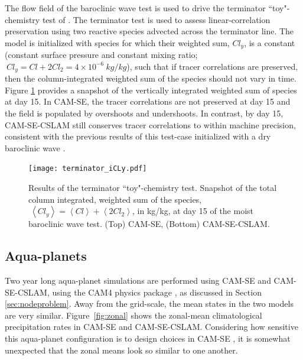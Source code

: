 \documentclass{ametsoc}
\begin{document}
The flow field of the baroclinic wave test is used to drive the terminator ``toy"-chemistry test of \cite{LCLVT2015GMD,LTOUNGK2017MWR}. The terminator test is used to assess linear-correlation preservation using two reactive species advected across the terminator line. The model is initialized with species for which their weighted sum, $Cl_y$, is a constant (constant surface pressure and constant mixing ratio;$\ Cl_y = Cl + 2Cl_2 = 4\times 10^{-6}\ kg/kg$), such that if tracer correlations are preserved, then the column-integrated weighted sum of the species should not vary in time. Figure \ref{fig:term} provides a snapshot of the vertically integrated weighted sum of species at day 15. In CAM-SE, the tracer correlations are not preserved at day 15 and the field is populated by overshoots and undershoots. In contrast, by day 15, CAM-SE-CSLAM still conserves tracer correlations to within machine precision, consistent with the previous results of this test-case initialized with a dry baroclinic wave \citep{LTOUNGK2017MWR}. 

\begin{figure}[t]
\begin{center}
\noindent\texttt{[image: terminator\_iCLy.pdf]}\\
\end{center}
\caption{Results of the terminator ``toy"-chemistry test. Snapshot of the total column integrated, weighted sum of the species,$\ \left< Cl_y \right> = \left< Cl \right> + \left< 2Cl_2 \right>$, in kg/kg, at day 15 of the moist baroclinic wave test. (Top) CAM-SE, (Bottom) CAM-SE-CSLAM.}
\label{fig:term}
\end{figure}

\subsection{Aqua-planets}

Two year long aqua-planet simulations are performed using CAM-SE and CAM-SE-CSLAM, using the CAM4 physics package \citep{CAM4}, as discussed in Section \ref{sec:nodeproblem}. Away from the grid-scale, the mean states in the two models are very similar. Figure~\ref{fig:zonal} shows the zonal-mean climatological precipitation rates in CAM-SE and CAM-SE-CSLAM. Considering how sensitive this aqua-planet configuration is to design choices in CAM-SE \citep{LetAl2018JAMES}, it is somewhat unexpected that the zonal means look so similar to one another. 
\end{document}
